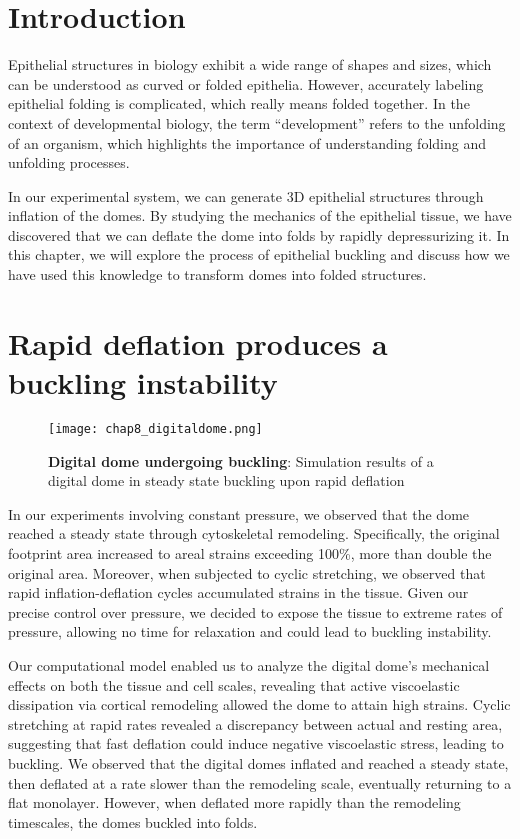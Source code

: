 \hypertarget{introduction}{%
\section{Introduction}\label{introduction5}}

Epithelial structures in biology exhibit a wide range of shapes and
sizes, which can be understood as curved or folded epithelia. However,
accurately labeling epithelial folding is complicated, which really
means folded together. In the context of developmental biology, the term
``development'' refers to the unfolding of an organism, which highlights
the importance of understanding folding and unfolding processes.

In our experimental system, we can generate 3D epithelial structures
through inflation of the domes. By studying the mechanics of the
epithelial tissue, we have discovered that we can deflate the dome into
folds by rapidly depressurizing it. In this chapter, we will explore the
process of epithelial buckling and discuss how we have used this
knowledge to transform domes into folded structures.

\hypertarget{rapid-deflation-produces-a-buckling-instability}{%
	\section{Rapid deflation produces a buckling
		instability}\label{rapid-deflation-produces-a-buckling-instability}}

\begin{figure}
	\centering
	\texttt{[image: chap8\_digitaldome.png]}
	\caption{\label{fig_8_1} \textbf{Digital dome undergoing buckling}: Simulation results of a digital dome in steady state buckling upon rapid deflation
	}
\end{figure}

In our experiments involving constant pressure, we observed that the
dome reached a steady state through cytoskeletal remodeling.
Specifically, the original footprint area increased to areal strains
exceeding 100\%, more than double the original area. Moreover, when
subjected to cyclic stretching, we observed that rapid
inflation-deflation cycles accumulated strains in the tissue. Given our
precise control over pressure, we decided to expose the tissue to
extreme rates of pressure, allowing no time for relaxation and could
lead to buckling instability.

Our computational model enabled us to analyze the digital dome's
mechanical effects on both the tissue and cell scales, revealing that
active viscoelastic dissipation via cortical remodeling allowed the dome
to attain high strains. Cyclic stretching at rapid rates revealed a
discrepancy between actual and resting area, suggesting that fast
deflation could induce negative viscoelastic stress, leading to
buckling. We observed that the digital domes inflated and reached a
steady state, then deflated at a rate slower than the remodeling scale,
eventually returning to a flat monolayer. However, when deflated more
rapidly than the remodeling timescales, the domes buckled into folds.

